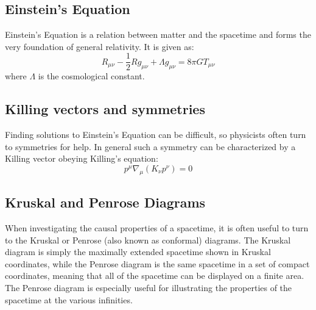 \subsection{Einstein's Equation}
\thispagestyle{empty}
Einstein's Equation is a relation between matter and the spacetime and forms the very foundation of general relativity. It is given as:
\begin{equation}
R_{\mu \nu} - \frac{1}{2} R g_{\mu \nu} + \Lambda g_{\mu \nu} = 8 \pi G T_{\mu \nu}
\end{equation}
where $\Lambda$ is the cosmological constant.

\thispagestyle{empty}
\subsection{Killing vectors and symmetries}
\thispagestyle{empty}
Finding solutions to Einstein's Equation can be difficult, so physicists often turn to symmetries for help. In general such a symmetry can be characterized by a Killing vector obeying Killing's equation:
\begin{equation}
p^\mu \nabla_\mu(K_\nu p^\nu) = 0
\end{equation}
%
\thispagestyle{empty}


\subsection{Kruskal and Penrose Diagrams}
\thispagestyle{empty}
When investigating the causal properties of a spacetime, it is often useful to turn to the Kruskal or Penrose (also known as conformal) diagrams. The Kruskal diagram is simply the maximally extended spacetime shown in Kruskal coordinates, while the Penrose diagram is the same spacetime in a set of compact coordinates, meaning that all of the spacetime can be displayed on a finite area. The Penrose diagram is especially useful for illustrating the properties of the spacetime at the various infinities.
\thispagestyle{empty}